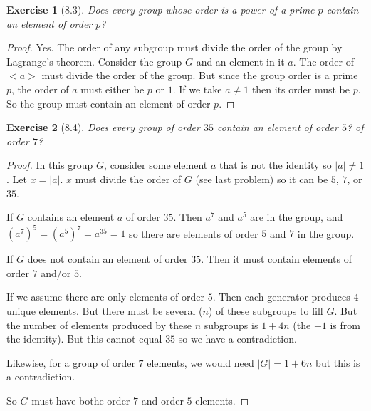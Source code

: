 \documentclass[12pt,leqno]{article}
\numberwithin{equation}{section}
\newtheorem*{exer}{Exercise}
\theoremstyle{definition}
\begin{document}
\begin{exer}[8.3] Does every group whose order is a power of a prime $p$
    contain an element of order $p$?

\end{exer}

\begin{proof}[Proof]

    Yes. The order of any subgroup must divide the order of the group by
    Lagrange's theorem. Consider the group $G$ and an element in it $a$. The
    order of $<a>$ must divide the order of the group. But since the group
    order is a prime $p$, the order of $a$ must either be $p$ or $1$. If we
    take $a \neq 1$ then its order must be $p$. So the group must contain an
    element of order $p$.

\end{proof}

\begin{exer}[8.4] Does every group of order $35$ contain an element of order
    $5$? of order $7$? 

\end{exer}

\begin{proof}[Proof]

    In this group $G$, consider some element $a$ that is not the identity so
    $\vert a \vert \neq 1$. Let $x = \vert a \vert$. $x$ must divide the order
    of $G$ (see last problem) so it can be $5$, $7$, or $35$.

    If $G$ contains an element $a$ of order $35$. Then $a^7$ and $a^5$ are in
    the group, and $(a^7)^5 = (a^5)^7 = a^{35} = 1$ so there are elements of
    order $5$ and $7$ in the group.

    If $G$ does not contain an element of order $35$. Then it must contain
    elements of order $7$ and/or $5$.

    If we assume there are only elements of order $5$. Then each generator
    produces $4$ unique elements.  But there must be several ($n$) of these
    subgroups to fill $G$. But the number of elements produced by these $n$
    subgroups is $1 + 4n$ (the $+1$ is from the identity). But this cannot
    equal $35$ so we have a contradiction.

    Likewise, for a group of order $7$ elements, we would need $\vert G \vert =
    1 + 6n$ but this is a contradiction. 

    So $G$ must have bothe order $7$ and order $5$ elements.

\end{proof}
\end{document}
